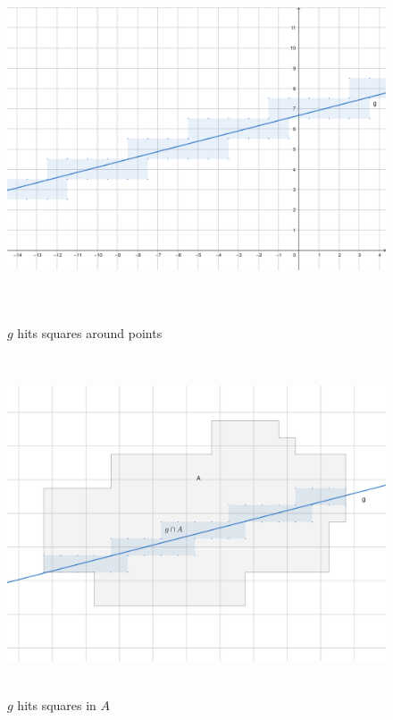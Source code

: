 \documentclass[12pt,a4paper]{scrartcl}
\numberwithin{equation}{subsection}
\newcommand{\1}{\mathbbm{1}}
\numberwithin{equation}{section}
\theoremstyle{definition}
\begin{document}
\begin{figure}
	\centering
	\includegraphics[height=10cm]{line-hit-squares.png}
	\caption{$g$ hits squares around points} \label{linesquares}
	\includegraphics[height=10cm]{line-hit-A.png}
	\caption{$g$ hits squares in $A$} \label{linesquaresA}
\end{figure}
\end{document}
